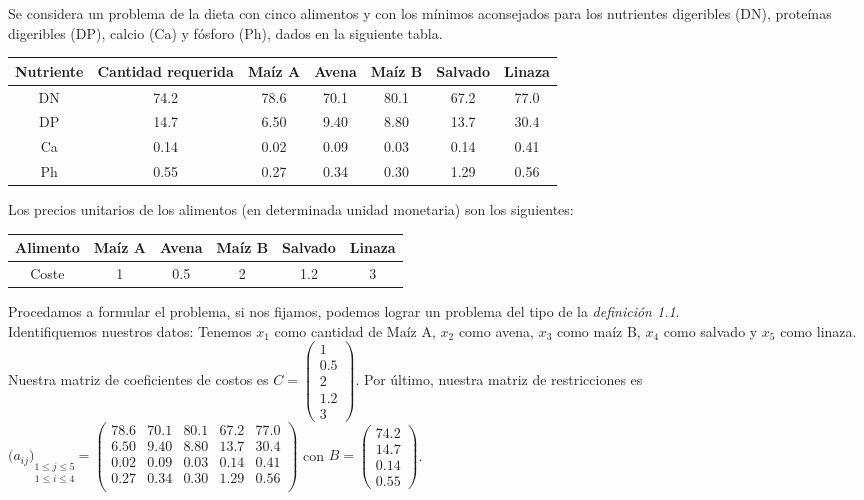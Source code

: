 \begin{ejem} Se considera un problema de la dieta con cinco alimentos y con los mínimos aconsejados para los nutrientes digeribles (DN), proteínas digeribles (DP), calcio (Ca) y fósforo (Ph), dados en la siguiente tabla.
\begin{center}
\begin{tabular}{|c|c|c|c|c|c|c|}
\hline
Nutriente & Cantidad requerida & Maíz A & Avena & Maíz B & Salvado & Linaza \\ \hline
DN & 74.2 & 78.6 & 70.1 & 80.1 & 67.2 & 77.0\\ \hline
DP & 14.7 & 6.50 & 9.40 & 8.80 & 13.7 & 30.4\\ \hline
Ca & 0.14 & 0.02 & 0.09 & 0.03 & 0.14 & 0.41\\ \hline
Ph & 0.55 & 0.27 & 0.34 & 0.30 & 1.29 & 0.56 \\ \hline
\end{tabular}
\end{center}
Los precios unitarios de los alimentos (en determinada unidad monetaria) son los siguientes:
\begin{center}
\begin{tabular}{|c|c|c|c|c|c|}
\hline
Alimento & Maíz A & Avena & Maíz B & Salvado & Linaza \\ \hline
Coste & 1 & 0.5 & 2 & 1.2 & 3\\ \hline
\end{tabular}
\end{center}
Procedamos a formular el problema, si nos fijamos, podemos lograr un problema del tipo de la \textit{definición 1.1}.\\

Identifiquemos nuestros datos: Tenemos $x_1$ como cantidad de Maíz A, $x_2$ como avena, $x_3$ como maíz B, $x_4$ como salvado y $x_5$ como linaza. Nuestra matriz de coeficientes de costos es $C=\begin{pmatrix}1\\0.5\\2\\1.2\\3\end{pmatrix}$. Por último, nuestra matriz de restricciones es\\
$\big(a_{ij}\big)\underset{1\leq i\leq 4}{\underset{1\leq j \leq 5}{\ }}=\begin{pmatrix}78.6 & 70.1 & 80.1 & 67.2 & 77.0\\6.50 & 9.40 & 8.80 & 13.7 & 30.4\\0.02 & 0.09 & 0.03 & 0.14 & 0.41\\0.27 & 0.34 & 0.30 & 1.29 & 0.56 \\\end{pmatrix}$ con $B=\begin{pmatrix}74.2\\14.7\\0.14\\0.55\end{pmatrix}$.\\


\end{ejem}

